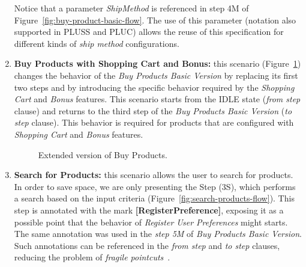 \documentclass{acm_proc_article-sp}
\begin{document}
\begin{enumerate}
 Notice that a parameter \emph{ShipMethod} is referenced in step 4M of Figure~\ref{fig:buy-product-basic-flow}. The use of this parameter (notation also supported in PLUSS and PLUC) allows the reuse of this specification 
for different kinds of \emph{ship method} configurations.


\item {\bf Buy Products with Shopping Cart and Bonus:} this scenario (Figure~\ref{fig:buy-product-changing-flow}) changes the behavior of the \emph{Buy Products Basic Version} by replacing its first two steps and by introducing the specific behavior required by the \emph{Shopping Cart} and 
\emph{Bonus} features. This scenario starts from the IDLE state (\emph{from step} clause) and returns to the third step of the \emph{Buy Products Basic Version} (\emph{to step} clause). This behavior is required for products that are configured with \emph{Shopping Cart} and \emph{Bonus} features.

\begin{figure}[h]
\caption{Extended version of Buy Products.}
\label{fig:buy-product-changing-flow}
\end{figure}

\item {\bf Search for Products:} this scenario allows the user to search for products. In order to save space, we are only presenting the Step (3S), which performs a search based on the input criteria (Figure~\ref{fig:search-products-flow}). This step is annotated with the mark \mbox{{\bf [RegisterPreference]}}, exposing it as a possible point that the behavior of \emph{Register User Preferences} might starts. The same annotation was used in the \emph{step 5M} of \emph{Buy Products Basic Version}. Such annotations can be referenced in the \emph{from step} and \emph{to step} clauses, reducing the problem of \emph{fragile pointcuts}~\cite{rashid-aosd-2007}.


\end{enumerate}
\end{document}
